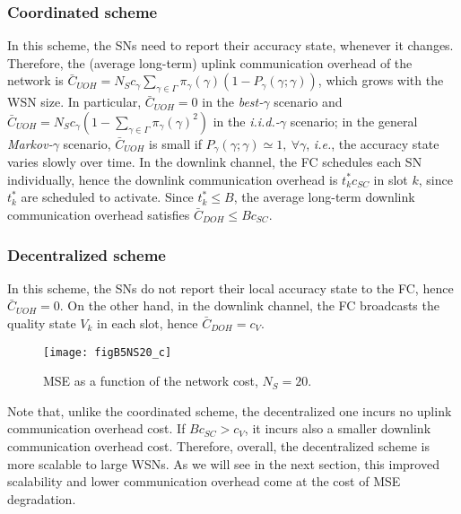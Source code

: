 \documentclass[10pt,twocolumn,twoside]{IEEEtran}
\theoremstyle{plain}
\begin{document}
\subsubsection{Coordinated scheme}
In this scheme, the SNs need to report their accuracy state, whenever it changes.
Therefore, the (average long-term) uplink communication overhead of the network is $\bar C_{UOH}{=}N_Sc_{\gamma}\sum_{\gamma\in\Gamma}\pi_{\gamma}(\gamma)(1{-}P_\gamma(\gamma;\gamma))
$, which grows with the WSN size.
In particular, $\bar C_{UOH}{=}0$ in the \emph{best-}$\gamma$ scenario and 
$\bar C_{UOH}{=}N_Sc_{\gamma}\left(1{-}\sum_{\gamma\in\Gamma}\pi_{\gamma}(\gamma)^2\right)$ in the \emph{i.i.d.-}$\gamma$ scenario;
in the general  \emph{Markov-}$\gamma$ scenario, $\bar C_{UOH}$ is small if $P_\gamma(\gamma;\gamma)\simeq 1,\ \forall \gamma$, \emph{i.e.}, the accuracy state varies slowly over time.
In the downlink channel, the FC schedules each SN individually, hence the downlink communication overhead is $t_k^*c_{SC}$ in slot $k$, since $t_k^*$ are scheduled to activate.
Since $t_k^*\leq B$, the average long-term downlink communication overhead satisfies $\bar C_{DOH}\leq Bc_{SC}$.
\subsubsection{Decentralized scheme}
In this scheme, the SNs do not report their local accuracy state to the FC, hence $\bar C_{UOH}=0$.
On the other hand, in the downlink channel, the FC broadcasts the quality state $V_k$ in each slot, hence $\bar C_{DOH}=c_V$.

 \begin{figure}[t]
\centering
\texttt{[image: figB5NS20\_c]}
\vspace{-3mm}
\caption{MSE as a function of the network cost, $N_S=20$.}\label{NS100B1}
\vspace{-5mm}
\end{figure}


Note that, unlike the coordinated scheme, the decentralized one incurs no uplink communication overhead cost. If $Bc_{SC}>c_V$,
it incurs also a smaller downlink communication overhead cost. Therefore, overall, the decentralized scheme is more scalable to large WSNs. As we will see in the next section, 
this improved scalability and lower communication overhead come at the cost of MSE degradation.
\vspace{-3mm}
\end{document}
